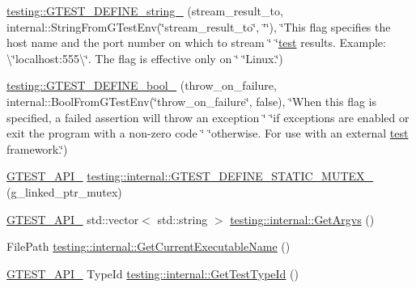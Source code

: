 \begin{DoxyCompactItemize}
\item 
\mbox{\hyperlink{namespacetesting_a5cfe9778e1cc8b5cf04bfe9e764ddff6}{testing\+::\+G\+T\+E\+S\+T\+\_\+\+D\+E\+F\+I\+N\+E\+\_\+string\+\_\+}} (stream\+\_\+result\+\_\+to, internal\+::\+String\+From\+G\+Test\+Env(\char`\"{}stream\+\_\+result\+\_\+to\char`\"{}, \char`\"{}\char`\"{}), \char`\"{}This flag specifies the host name and the port number on which to stream \char`\"{} \char`\"{}\mbox{\hyperlink{_mutual_8h_a707ee03719e99670bf6cfdfd897b8456}{test}} results. Example\+: \textbackslash{}\char`\"{}localhost\+:555\textbackslash{}\char`\"{}. The flag is effective only on \char`\"{} \char`\"{}Linux.\char`\"{})
\item 
\mbox{\hyperlink{namespacetesting_a2850b20fc3080527fae82aa170ef9aa5}{testing\+::\+G\+T\+E\+S\+T\+\_\+\+D\+E\+F\+I\+N\+E\+\_\+bool\+\_\+}} (throw\+\_\+on\+\_\+failure, internal\+::\+Bool\+From\+G\+Test\+Env(\char`\"{}throw\+\_\+on\+\_\+failure\char`\"{}, false), \char`\"{}When this flag is specified, a failed assertion will throw an exception \char`\"{} \char`\"{}if exceptions are enabled or exit the program with a non-\/zero code \char`\"{} \char`\"{}otherwise. For use with an external \mbox{\hyperlink{_mutual_8h_a707ee03719e99670bf6cfdfd897b8456}{test}} framework.\char`\"{})
\item 
\mbox{\hyperlink{_obj__test_2lib_2googletest-release-1_88_81_2googletest_2include_2gtest_2internal_2gtest-port_8h_aa73be6f0ba4a7456180a94904ce17790}{G\+T\+E\+S\+T\+\_\+\+A\+P\+I\+\_\+}} \mbox{\hyperlink{namespacetesting_1_1internal_aff419d76acc3727be48d195f927189c9}{testing\+::internal\+::\+G\+T\+E\+S\+T\+\_\+\+D\+E\+F\+I\+N\+E\+\_\+\+S\+T\+A\+T\+I\+C\+\_\+\+M\+U\+T\+E\+X\+\_\+}} (g\+\_\+linked\+\_\+ptr\+\_\+mutex)
\item 
\mbox{\hyperlink{_obj__test_2lib_2googletest-release-1_88_81_2googletest_2include_2gtest_2internal_2gtest-port_8h_aa73be6f0ba4a7456180a94904ce17790}{G\+T\+E\+S\+T\+\_\+\+A\+P\+I\+\_\+}} std\+::vector$<$ std\+::string $>$ \mbox{\hyperlink{namespacetesting_1_1internal_a9608256c67f889006be44912e57e3d4f}{testing\+::internal\+::\+Get\+Argvs}} ()
\item 
File\+Path \mbox{\hyperlink{namespacetesting_1_1internal_a7a2bbf069f75bc99873976ad6fc356ad}{testing\+::internal\+::\+Get\+Current\+Executable\+Name}} ()
\item 
\mbox{\hyperlink{_obj__test_2lib_2googletest-release-1_88_81_2googletest_2include_2gtest_2internal_2gtest-port_8h_aa73be6f0ba4a7456180a94904ce17790}{G\+T\+E\+S\+T\+\_\+\+A\+P\+I\+\_\+}} Type\+Id \mbox{\hyperlink{namespacetesting_1_1internal_ad0d66d56ead224263cd100c1d6bfc562}{testing\+::internal\+::\+Get\+Test\+Type\+Id}} ()

\end{DoxyCompactItemize}
